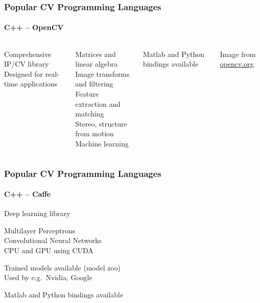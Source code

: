 \documentclass[xetex,professionalfont]{beamer}
\begin{document}
\begin{frame}
\frametitle{Popular CV Programming Languages}
\framesubtitle{C++ -- OpenCV}

\begin{columns}

Comprehensive IP/CV library\\
Designed for real-time applications

\medskip
Matrices and linear algebra\\
Image transforms and filtering\\
Feature extraction and matching\\
Stereo, structure from motion\\
Machine learning %

\medskip
Matlab and Python bindings available


\begin{center}
{
	{\centering Image from \url{opencv.org}}}
\end{center}

\end{columns}

\end{frame}


\begin{frame}
\frametitle{Popular CV Programming Languages}
\framesubtitle{C++ -- Caffe}

Deep learning library

\medskip
Multilayer Perceptrons \\
Convolutional Neural Networks \\
CPU and GPU using CUDA

\medskip
Trained models available (model zoo)\\
Used by e.g.\ Nvidia, Google

\medskip
Matlab and Python bindings available

\end{frame}
\end{document}
